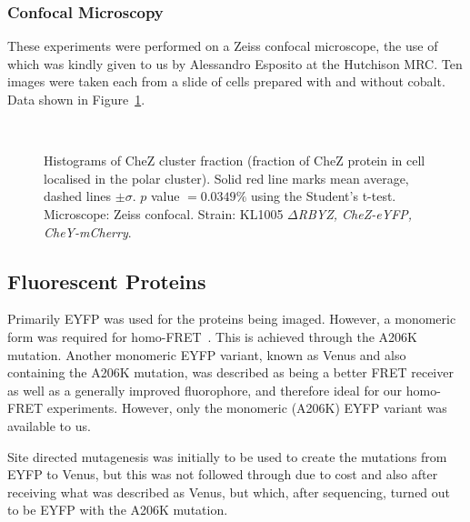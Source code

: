\documentclass[../main.tex]{subfiles}
\begin{document}
\subsubsection{Confocal Microscopy}
\label{sec:results:cs:confocal}
These experiments were performed on a Zeiss confocal microscope, the use of which was kindly given to us by Alessandro Esposito at the Hutchison MRC. Ten images were taken each from a slide of cells prepared with and without cobalt. Data shown in Figure~\ref{fig:results:zeiss}.

\begin{figure}
\begin{center}
\\
\caption[Image processing results on Zeiss confocal microscope]{Histograms of CheZ cluster fraction (fraction of CheZ protein in cell localised in the polar cluster). Solid red line marks mean average, dashed lines \(\pm\sigma\). \(p\) value \(=0.0349\%\) using the Student's t-test. Microscope: Zeiss confocal. Strain: KL1005 \textsl{\(\Delta\)RBYZ, CheZ-eYFP, CheY-mCherry}.}
\label{fig:results:zeiss}
\end{center}
\end{figure}

\cleardoublepage

\subsection{Fluorescent Proteins}

Primarily EYFP was used for the proteins being imaged. However, a monomeric form was required for homo-FRET~\citep{vaknin07}. This is achieved through the A206K mutation. Another monomeric EYFP variant, known as Venus and also containing the A206K mutation, was described as being a better FRET receiver~\citep{nagai02} as well as a generally improved fluorophore, and therefore ideal for our homo-FRET experiments. However, only the monomeric (A206K) EYFP variant was available to us.

Site directed mutagenesis was initially to be used to create the mutations from EYFP to Venus, but this was not followed through due to cost and also after receiving what was described as Venus, but which, after sequencing, turned out to be EYFP with the A206K mutation.
\end{document}
